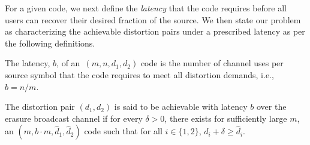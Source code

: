 

For a given code, we next define the {\it latency} that the code requires before all users can recover their desired fraction of the source.  We then state our problem as characterizing the achievable distortion pairs under a prescribed latency as per the following definitions.

\begin{mydef}
	The latency, $b$, of an~$(m, n, d_{1}, d_{2})$ code is the number of channel uses per source symbol that the code requires to meet all distortion demands, i.e., $b = n/m$.
\end{mydef}

\begin{mydef}
\label{def:achievable}
	The distortion pair $(d_{1}, d_{2})$ is said to be achievable with latency $b$ over the erasure broadcast channel if for every $\delta > 0$, there exists for sufficiently large $m$, an $(m, b\cdot m, \hat{d}_{1}, \hat{d}_{2})$ code such that for all $i \in \{1, 2\}$, $d_{i}+\delta \geq \hat{d}_{i}$.
\end{mydef}

%	
%	
%

